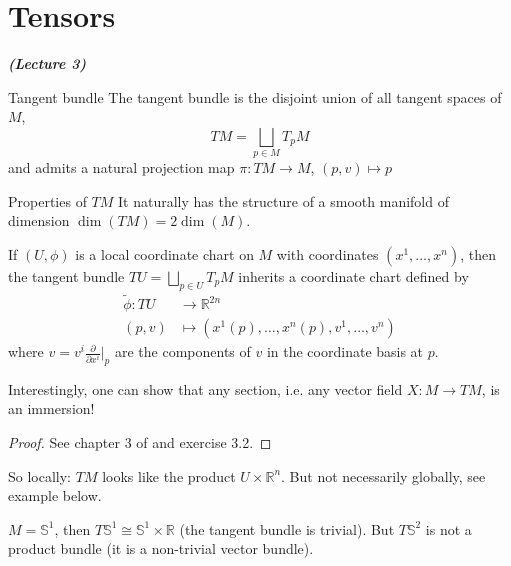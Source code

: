 \newpage

\section{Tensors}

\vspace{0.4cm}\emph{\textbf{(Lecture 3)}}\\



\begin{colordef}{Tangent bundle}{}
The tangent bundle is the disjoint union of all tangent spaces of $M$,
\[
TM = \bigsqcup_{p \in M} T_p M
\]
and admits a natural projection map $\pi:TM \to M$, $(p,v) \mapsto p$
\end{colordef}



\begin{colorlem}{Properties of $TM$}{}
It naturally has the structure of a smooth manifold of dimension $\dim(TM) = 2\dim(M)$.

If $(U, \phi)$ is a local coordinate chart on $M$ with coordinates $(x^1, \dots, x^n)$, then the tangent bundle $TU = \bigsqcup_{p \in U} T_p M$ inherits a coordinate chart defined by
\begin{align*}
    \widetilde{\phi}: TU &\longrightarrow \mathbb{R}^{2n} \\
    (p, v) &\mapsto (x^1(p), \dots, x^n(p), v^1, \dots, v^n)
\end{align*}
where $v = v^i \frac{\partial}{\partial x^i}|_p$ are the components of $v$ in the coordinate basis at $p$.

Interestingly, one can show that any section, i.e. any vector field $X: M \to TM$, is an immersion!
\end{colorlem}
\begin{proof}
    See chapter 3 of \cite{tsakanikas2024dg2} and exercise 3.2.
\end{proof}

So locally: $TM$ looks like the product $U \times \mathbb{R}^n$. But not necessarily globally, see example below.

\begin{colexample}{}{}
$M = \mathbb{S}^1$, then $T\mathbb{S}^1 \cong \mathbb{S}^1 \times \mathbb{R}$ (the tangent bundle is trivial). But $T\mathbb{S}^2$ is not a product bundle (it is a non-trivial vector bundle).
\end{colexample}

